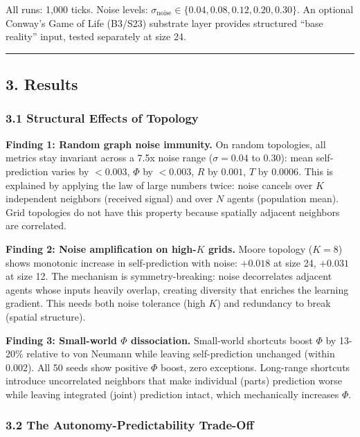 \documentclass[
  11pt,
]{article}
\begin{document}
All runs: 1,000 ticks. Noise levels:
\(\sigma_{\text{noise}} \in \{0.04, 0.08, 0.12, 0.20, 0.30\}\). An
optional Conway's Game of Life (B3/S23) substrate layer provides
structured ``base reality'' input, tested separately at size 24.

\begin{center}\rule{0.5\linewidth}{0.5pt}\end{center}

\subsection{3. Results}\label{results}

\subsubsection{3.1 Structural Effects of
Topology}\label{structural-effects-of-topology}

\textbf{Finding 1: Random graph noise immunity.} On random topologies,
all metrics stay invariant across a 7.5x noise range (\(\sigma = 0.04\)
to \(0.30\)): mean self-prediction varies by \(< 0.003\), \(\Phi\) by
\(< 0.003\), \(R\) by \(0.001\), \(T\) by \(0.0006\). This is explained
by applying the law of large numbers twice: noise cancels over \(K\)
independent neighbors (received signal) and over \(N\) agents
(population mean). Grid topologies do not have this property because
spatially adjacent neighbors are correlated.

\textbf{Finding 2: Noise amplification on high-\(K\) grids.} Moore
topology (\(K = 8\)) shows monotonic increase in self-prediction with
noise: \(+0.018\) at size 24, \(+0.031\) at size 12. The mechanism is
symmetry-breaking: noise decorrelates adjacent agents whose inputs
heavily overlap, creating diversity that enriches the learning gradient.
This needs both noise tolerance (high \(K\)) and redundancy to break
(spatial structure).

\textbf{Finding 3: Small-world \(\Phi\) dissociation.} Small-world
shortcuts boost \(\Phi\) by 13-20\% relative to von Neumann while
leaving self-prediction unchanged (within 0.002). All 50 seeds show
positive \(\Phi\) boost, zero exceptions. Long-range shortcuts introduce
uncorrelated neighbors that make individual (parts) prediction worse
while leaving integrated (joint) prediction intact, which mechanically
increases \(\Phi\).

\subsubsection{3.2 The Autonomy-Predictability
Trade-Off}\label{the-autonomy-predictability-trade-off}
\end{document}
